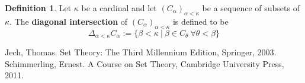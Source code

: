 \documentclass[11pt]{article}
\theoremstyle{definition}
\newtheorem{defin}{Definition}
\begin{document}
\begin{defin}
    Let $\kappa$ be a cardinal and let $(C_\alpha)_{\alpha <\kappa}$ be a sequence of subsets of
    $\kappa$. The \textbf{diagonal intersection} of $(C_\alpha)_{\alpha <\kappa}$ is defined to be
    $$\Delta_{\alpha<\kappa}C_\alpha:=\{\beta <\kappa\ |\ \beta \in C_{\theta}\ \forall\theta<\beta\}$$
\end{defin}

\begin{thebibliography}{}
    \bibitem{} Jech, Thomas. Set Theory: The Third Millennium Edition, Springer, 2003.
    \bibitem{} Schimmerling, Ernest. A Course on Set Theory, Cambridge University Press, 2011.
\end{thebibliography}
\end{document}

